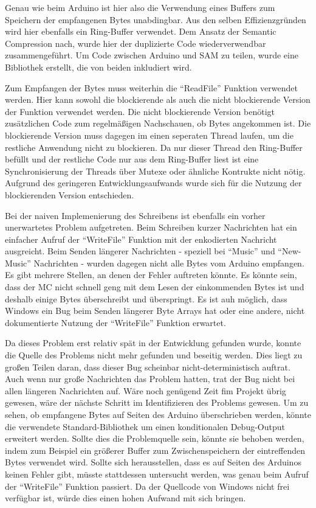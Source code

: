 Genau wie beim Arduino ist hier also die Verwendung eines Buffers zum Speichern der empfangenen Bytes unabdingbar.
Aus den selben Effizienzgründen wird hier ebenfalls ein Ring-Buffer verwendet.
Dem Ansatz der Semantic Compression nach, wurde hier der duplizierte Code wiederverwendbar zusammengeführt.
Um Code zwischen Arduino und \ac{SAM} zu teilen, wurde eine Bibliothek erstellt, die von beiden inkludiert wird.

Zum Empfangen der Bytes muss weiterhin die \enquote{ReadFile} Funktion verwendet werden.
Hier kann sowohl die blockierende als auch die nicht blockierende Version der Funktion verwendet werden.
Die nicht blockierende Version benötigt zusätzlichen Code zum regelmäßigen Nachschauen, ob Bytes angekommen ist.
Die blockierende Version muss dagegen im einen seperaten Thread laufen, um die restliche Anwendung nicht zu blockieren.
Da nur dieser Thread den Ring-Buffer befüllt und der restliche Code nur aus dem Ring-Buffer liest ist eine Synchronisierung der Threads über Mutexe oder ähnliche Kontrukte nicht nötig.
Aufgrund des geringeren Entwicklungsaufwands wurde sich für die Nutzung der blockierenden Version entschieden.

Bei der naiven Implemenierung des Schreibens ist ebenfalls ein vorher unerwartetes Problem aufgetreten.
Beim Schreiben kurzer Nachrichten hat ein einfacher Aufruf der \enquote{WriteFile} Funktion mit der enkodierten Nachricht ausgreicht.
Beim Senden längerer Nachrichten - speziell bei \enquote{Music} und \enquote{New-Music} Nachrichten - wurden dagegen nicht alle Bytes vom Arduino empfangen.
Es gibt mehrere Stellen, an denen der Fehler auftreten könnte.
Es könnte sein, dass der \ac{MC} nicht schnell geng mit dem Lesen der einkommenden Bytes ist und deshalb einige Bytes überschreibt und überspringt.
Es ist auh möglich, dass Windows ein Bug beim Senden längerer Byte Arrays hat oder eine andere, nicht dokumentierte Nutzung der \enquote{WriteFile} Funktion erwartet.

Da dieses Problem erst relativ spät in der Entwicklung gefunden wurde, konnte die Quelle des Problems nicht mehr gefunden und beseitig werden.
Dies liegt zu großen Teilen daran, dass dieser Bug scheinbar nicht-deterministisch auftrat.
Auch wenn nur große Nachrichten das Problem hatten, trat der Bug nicht bei allen längeren Nachrichten auf.
Wäre noch genügend Zeit fim Projekt übrig gewesen, wäre der nächste Schritt im Identifizieren des Problems gewesen.
Um zu sehen, ob empfangene Bytes auf Seiten des Arduino überschrieben werden, könnte die verwendete Standard-Bibliothek um einen konditionalen Debug-Output erweitert werden.
Sollte dies die Problemquelle sein, könnte sie behoben werden, indem zum Beispiel ein größerer Buffer zum Zwischenspeichern der eintreffenden Bytes verwendet wird.
Sollte sich herausstellen, dass es auf Seiten des Arduinos keinen Fehler gibt, müsste stattdessen untersucht werden, was genau beim Aufruf der \enquote{WriteFile} Funktion passiert.
Da der Quellcode von Windows nicht frei verfügbar ist, würde dies einen hohen Aufwand mit sich bringen.

